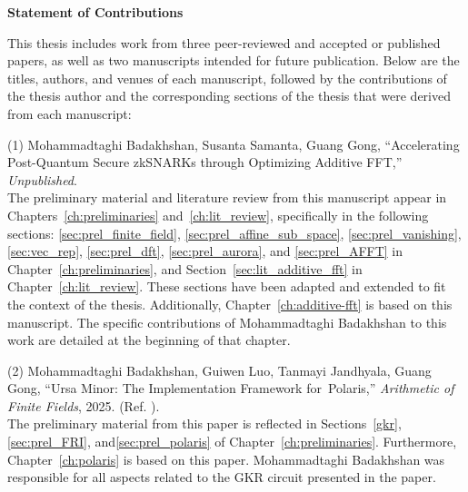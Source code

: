 \cleardoublepage
{}    %

\begin{center}\textbf{Statement of Contributions}\end{center}

This thesis includes work from three peer-reviewed and accepted or published papers, as well as two manuscripts intended for future publication. Below are the titles, authors, and venues of each manuscript, followed by the contributions of the thesis author and the corresponding sections of the thesis that were derived from each manuscript:

\noindent (1) Mohammadtaghi Badakhshan, Susanta Samanta, Guang Gong, ``Accelerating Post-Quantum Secure zkSNARKs through Optimizing Additive FFT,'' \textit{Unpublished}.\ \\
The preliminary material and literature review from this manuscript appear in Chapters~\ref{ch:preliminaries} and~\ref{ch:lit_review}, specifically in the following sections: \ref{sec:prel_finite_field}, \ref{sec:prel_affine_sub_space}, \ref{sec:prel_vanishing}, \ref{sec:vec_rep}, \ref{sec:prel_dft}, \ref{sec:prel_aurora}, and \ref{sec:prel_AFFT} in Chapter~\ref{ch:preliminaries}, and Section~\ref{sec:lit_additive_fft} in Chapter~\ref{ch:lit_review}. These sections have been adapted and extended to fit the context of the thesis.
Additionally, Chapter~\ref{ch:additive-fft} is based on this manuscript. The specific contributions of Mohammadtaghi Badakhshan to this work are detailed at the beginning of that chapter.

\noindent (2) Mohammadtaghi Badakhshan, Guiwen Luo, Tanmayi Jandhyala, Guang Gong, ``Ursa Minor: The Implementation Framework for Polaris,'' \textit{Arithmetic of Finite Fields}, 2025. (Ref. \cite{Badakhshan2025Ursa}).\\
The preliminary material from this paper is reflected in Sections~\ref{gkr},\ref{sec:prel_FRI}, and\ref{sec:prel_polaris} of Chapter~\ref{ch:preliminaries}. Furthermore, Chapter~\ref{ch:polaris} is based on this paper. Mohammadtaghi Badakhshan was responsible for all aspects related to the GKR circuit presented in the paper.

